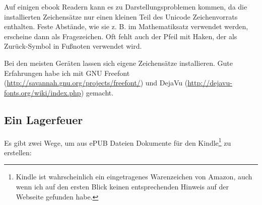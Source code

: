 \documentclass[11pt,ngerman,a4paper]{article}
\begin{document}
Auf einigen ebook Readern kann es zu Darstellungsproblemen kommen, da
die installierten Zeichensätze nur einen kleinen Teil des Unicode
Zeichenvorrats enthalten. Feste Abstände, wie sie z. B. im
Mathematiksatz verwendet werden, erscheine dann als Fragezeichen. Oft
fehlt auch der Pfeil mit Haken, der als Zurück-Symbol in Fußnoten
verwendet wird.

Bei den meisten Geräten lassen sich eigene Zeichensätze installieren.
Gute Erfahrungen habe ich mit GNU Freefont
(\url{http://savannah.gnu.org/projects/freefont/}) und DejaVu
(\url{http://dejavu-fonts.org/wiki/index.php}) gemacht.

\subsection{Ein Lagerfeuer}

Es gibt zwei Wege, um aus ePUB Dateien Dokumente für den
Kindle\footnote{Kindle ist wahrscheinlich ein eingetragenes Warenzeichen
  von Amazon, auch wenn ich auf den ersten Blick keinen entsprechenden
  Hinweis auf der Webseite gefunden habe.} zu erstellen:
\end{document}
